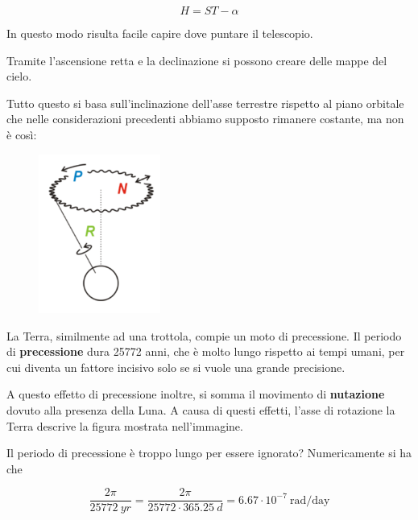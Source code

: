 $$H=ST-\alpha$$

In questo modo risulta facile capire dove puntare il telescopio.

Tramite l'ascensione retta e la declinazione si possono creare delle mappe del cielo.

\vspace{0.2cm}Tutto questo si basa sull'inclinazione dell'asse terrestre rispetto al piano orbitale che nelle considerazioni precedenti abbiamo supposto rimanere costante, ma non è così:

\vspace{-0.3cm}

\begin{minipage}{0.345\textwidth}
    \begin{figure}[H]
        \centering
        \includegraphics[width=4cm]{immagini/precessione_e_nutazione.png}
    \end{figure}
\end{minipage}
\begin{minipage}{0.65\textwidth}
    \vspace{0.5cm}La Terra, similmente ad una trottola, compie un moto di precessione\footnotemark. Il periodo di \textbf{precessione} dura 25772 anni, che è molto lungo rispetto ai tempi umani, per cui diventa un fattore incisivo solo se si vuole una grande precisione.

    A questo effetto di precessione inoltre, si somma il movimento di \textbf{nutazione} dovuto alla presenza della Luna. A causa di questi effetti, l'asse di rotazione la Terra descrive la figura mostrata nell'immagine.
\end{minipage}


Il periodo di precessione è troppo lungo per essere ignorato? Numericamente si ha che

$$\frac{2\pi}{25772\ yr}=\frac{2\pi}{25772\cdot 365.25\ d}=6.67\cdot 10^{-7}\ \text{rad/day}$$

